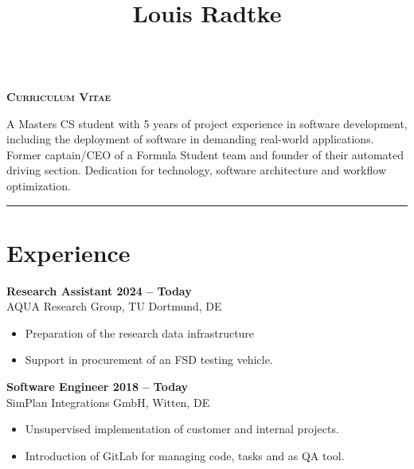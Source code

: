 \documentclass[a4paper,11pt]{article}
\newcommand{\subsectionskip}[0]{\vspace{0.125cm}}
\newcommand{\col}[2]{\textcolor[HTML]{#1}{#2}}
\begin{document}
\hfill
\begin{minipage}[t]{0.65\textwidth}
    \vspace{0cm} %
    \begin{center}
        \title*{\Huge \textbf{Louis Radtke}}\\
        \textsc{\textbf{Curriculum Vitae}}
    \end{center}

    \vspace{0.125cm}

    {
        \small A Masters CS student with 5 years of project experience in software development, including the deployment of software in demanding real-world applications. Former captain/CEO of a Formula Student team and founder of their automated driving section. Dedication for technology, software architecture and workflow optimization.
    }


    \vspace{0.25cm}
    \hrule

    \section*{\col{ac7448}{Experience}}
    \col{b27c52}{\textbf{Research Assistant \hfill 2024 -- Today}}\\
    AQUA Research Group, TU Dortmund, DE
    \begin{itemize}
        \small
        \item Preparation of the research data infrastructure
        \item Support in procurement of an FSD testing vehicle.
    \end{itemize}

    \subsectionskip

    \col{b3805b}{\textbf{Software Engineer \hfill 2018 -- Today}} \\
    SimPlan Integrations GmbH, Witten, DE
    \begin{itemize}
        \small
        \item Unsupervised implementation of customer and internal projects.
        \item Introduction of GitLab for managing code, tasks and as QA tool.
    \end{itemize}


\end{minipage}
\end{document}
